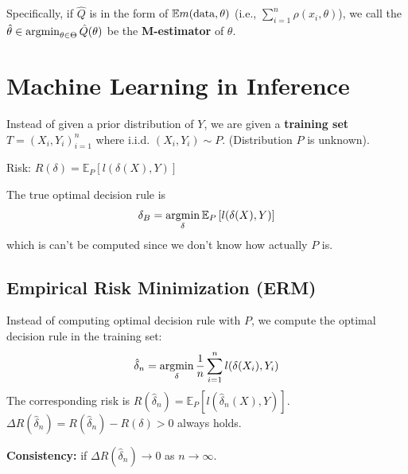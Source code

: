 \documentclass[11pt]{elegantbook}
\newcommand{\argmin}{\operatornamewithlimits{argmin}}
\begin{document}
Specifically, if $\hat{Q}$ is in the form of $\mathbb{E}m(\textnormal{data},\theta)$ (i.e., $\sum_{i=1}^n \rho(x_i,\theta)$), we call the $\hat{\theta}\in\argmin_{\theta\in\Theta} \hat{Q}(\theta)$ be the \textbf{M-estimator} of $\theta$.











\chapter{Machine Learning in Inference}
Instead of given a prior distribution of $Y$, we are given a \textbf{training set} $T=(X_i,Y_i)_{i=1}^n$ where i.i.d. $(X_i,Y_i)\sim P$. (Distribution $P$ is unknown).

Risk: $R(\delta)=\mathbb{E}_P\left[l(\delta(X),Y)\right]$

The true optimal decision rule is $$\delta_B=\argmin_\delta \mathbb{E}_P\left[l(\delta(X),Y)\right]$$
which is can't be computed since we don't know how actually $P$ is.

\section{Empirical Risk Minimization (ERM)}
Instead of computing optimal decision rule with $P$, we compute the optimal decision rule in the training set:
$$\hat{\delta}_n=\argmin_\delta \frac{1}{n}\sum_{i=1}^nl(\delta(X_i),Y_i)$$
The corresponding risk is $R(\hat{\delta}_n)=\mathbb{E}_P\left[l(\hat{\delta}_n(X),Y)\right]$. $\Delta R(\hat{\delta}_n)=R(\hat{\delta}_n)- R(\delta)>0$ always holds.

\textbf{Consistency:} if $\Delta R(\hat{\delta}_n) \rightarrow 0$ as $n \rightarrow \infty$.
\end{document}

